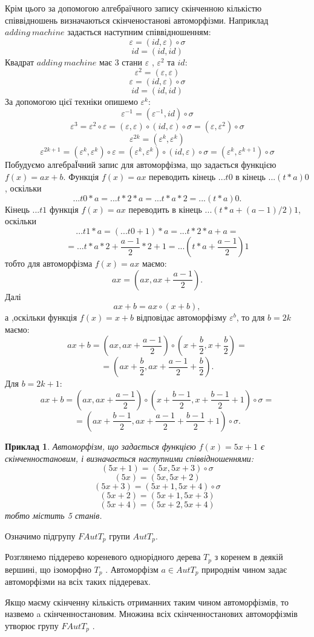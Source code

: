 \documentclass[a4paper,12pt]{article} \usepackage{a4wide}
\numberwithin{equation}{subsection}
\newtheorem{example}{Приклад}[subsection]
\begin{document}
Крім цього за допомогою алгебраїчного запису скінченною кількістю співвідношень визначаються скінченостанові автоморфізми. Наприклад  $adding \ machine$ задається наступним співвідношенням:
$$\varepsilon=(id,\varepsilon)\circ \sigma$$
$$id=(id,id)$$
Квадрат $adding \ machine$ має 3 стани $\varepsilon$ , $\varepsilon^2$ та $id$:
$$\varepsilon^2=(\varepsilon,\varepsilon)$$
$$\varepsilon=(id,\varepsilon)\circ \sigma$$
$$id=(id,id)$$
За допомогою цієї техніки опишемо $\varepsilon^k$:
$$\varepsilon^{-1}=(\varepsilon^{-1},id)\circ \sigma$$
$$\varepsilon^3=\varepsilon^2 \circ \varepsilon=(\varepsilon,\varepsilon) \circ (id,\varepsilon)\circ \sigma=(\varepsilon,\varepsilon^2)\circ \sigma $$
$$\varepsilon^{2k}=(\varepsilon^k,\varepsilon^k) $$
 $$\varepsilon^{2k+1}=(\varepsilon^k,\varepsilon^k)\circ \varepsilon= (\varepsilon^k,\varepsilon^k)
 \circ (id,\varepsilon)\circ \sigma=(\varepsilon^k,\varepsilon^{k+1})\circ \sigma $$
 Побудуємо алгебраЇчний запис для автоморфізма, що задається функцією $f(x)=ax+b$.
 Функція $f(x)=ax$ переводить кінець $...t0$ в кінець $...(t*a)0$, оскільки $$...t0*a=...t*2*a=...t*a*2=...(t*a)0.$$
 Кінець $...t1$ функція $f(x)=ax$ переводить в кінець $...(t*a+(a-1)/2)1$, оскільки $$...t1*a=(...t0+1)*a=...t*2*a+a=$$$$=...t*a*2+\frac{a-1}{2}*2+1=...(t*a+\frac{a-1}{2})1$$
тобто для автоморфізма $f(x)=ax$ маємо:
$$ax=(ax,ax+\frac{a-1}{2}).$$
Далі $$ax+b=ax\circ (x+b),$$
а ,оскільки функція $f(x)=x+b$ відповідає автоморфізму $\varepsilon^b$, то для $b=2k$ маємо:
$$ax+b=(ax,ax+\frac{a-1}{2})\circ (x+\frac{b}{2},x+\frac{b}{2})=$$ $$=(ax+\frac{b}{2},ax+\frac{a-1}{2}+\frac{b}{2}).$$
 Для $b=2k+1$:
$$ax+b=(ax,ax+\frac{a-1}{2})\circ (x+\frac{b-1}{2},x+\frac{b-1}{2}+1)\circ \sigma=$$
 $$=(ax+\frac{b-1}{2},ax+\frac{a-1}{2}+\frac{b-1}{2}+1)\circ \sigma.$$
\begin{example}
Автоморфізм, що задається функцією $f(x)=5x+1$ є скінченностановим, і визначається наступними співвідношеннями:
 $$(5x+1)=(5x,5x+3)\circ\sigma$$
$$(5x)=(5x,5x+2)$$
$$(5x+3)=(5x+1,5x+4)\circ\sigma$$
$$(5x+2)=(5x+1,5x+3)$$
$$(5x+4)=(5x+2,5x+4)$$
тобто містить 5 станів.
 \end{example}
 Означимо підгрупу $FAutT_p$  групи $AutT_p$.

 Розглянемо піддерево кореневого однорідного дерева $T_p$ з коренем в деякій вершині, що ізоморфно $T_p$ . Автоморфізм $a\in AutT_p$  природнім чином задає автоморфізми на всіх таких піддеревах.

 Якщо маєму скінченну кількість отриманних таким чином автоморфізмів, то назвемо a скінченностановим. Множина всіх скінченностанових автоморфізмів утворює групу $FAutT_p$ .
\end{document}
